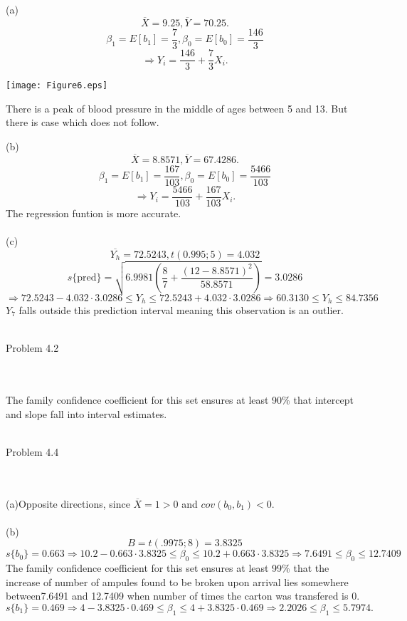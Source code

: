 \documentclass{article}
\begin{document}
\\\\(a)\[\overline{X}=9.25,\overline{Y}=70.25.\]
\[\beta_1=E[b_1]=\frac{7}{3},\beta_0=E[b_0]=\frac{146}{3}\]
\[\Rightarrow Y_i=\frac{146}{3}+\frac{7}{3}X_i.\]
\begin{center}
   \texttt{[image: Figure6.eps]}
   \begin{center}There is a peak of blood pressure in the middle of ages between 5 and 13. But there is case which does not follow.\end{center}\end{center}
   (b)\[\overline{X}=8.8571,\overline{Y}=67.4286.\]
\[\beta_1=E[b_1]=\frac{167}{103},\beta_0=E[b_0]=\frac{5466}{103}\]
\[\Rightarrow Y_i=\frac{5466}{103}+\frac{167}{103}X_i.\]
The regression funtion is more accurate.
\\\\(c)\[\overline{Y_h}=72.5243,t(0.995;5)=4.032\]
\[s\{\text{pred}\}=\sqrt{6.9981(\frac{8}{7}+\frac{(12-8.8571)^2}{58.8571})}=3.0286\]
\[\Rightarrow 72.5243-4.032\cdot3.0286\leq Y_h\leq72.5243+4.032\cdot3.0286\Rightarrow60.3130\leq Y_h\leq84.7356\]
$Y_7$ falls outside this prediction interval meaning this observation is an outlier.
\\\\\begin{large}Problem 4.2\end{large}
\\\\The family confidence coefficient for this set ensures at least 90\% that intercept and slope fall into interval estimates.
\\\\\begin{large}Problem 4.4\end{large}
\\\\(a)Opposite directions, since $\overline{X}=1>0$ and $cov(b_0,b_1)<0$.
\\\\(b)\[B=t(.9975;8)=3.8325\]
\[s\{b_0\}=0.663\Rightarrow10.2-0.663\cdot3.8325\leq\beta_0\leq10.2+0.663\cdot3.8325\Rightarrow7.6491\leq\beta_0\leq12.7409\]
The family confidence coefficient for this set ensures at least 99\% that the increase of number of ampules found to be broken upon arrival lies somewhere between7.6491 and 12.7409 when number of times the carton was transfered is 0.
\[s\{b_1\}=0.469\Rightarrow 4-3.8325\cdot0.469\leq\beta_1\leq4+3.8325\cdot0.469\Rightarrow 2.2026\leq\beta_1\leq5.7974.\]
\end{document}
